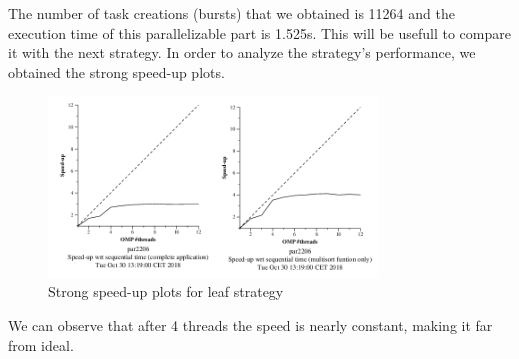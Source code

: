\documentclass{article}
\begin{document}
\justify
The number of task creations (bursts) that we obtained is 11264 and the execution time of this parallelizable part is 1.525s. This will be usefull to compare it with the next strategy.
\justify
In order to analyze the strategy's performance, we obtained the strong speed-up plots.
\begin{figure}[!h]
    \centering
    \includegraphics[width=0.78\textwidth]{strongLeafNC.png}
    \caption{Strong speed-up plots for leaf strategy}
    \label{fig:tareador}
\end{figure}
\justify
We can observe that after 4 threads the speed is nearly constant, making it far from ideal. 
\end{document}
